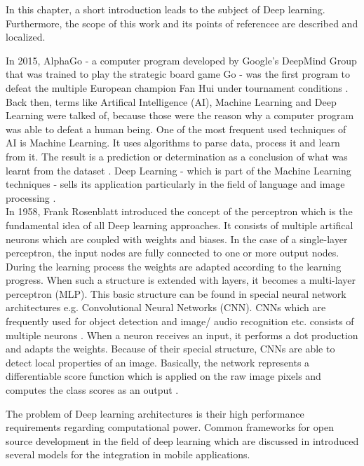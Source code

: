In this chapter, a short introduction leads to the subject of Deep learning. Furthermore, the scope of this work and its points of referencee are described and localized.

		
In 2015, AlphaGo - a computer program developed by Google's DeepMind Group that was trained to play the strategic board game Go - was the first program to defeat the multiple European champion Fan Hui under tournament conditions \citep{DeepMind}. Back then, terms like Artifical Intelligence (AI), Machine Learning and Deep Learning were talked of, because those were the reason why a computer program was able to defeat a human being. One of the most frequent used techniques of AI is Machine Learning. It uses algorithms to parse data, process it and learn from it. The result is a prediction or determination as a conclusion of what was learnt from the dataset \citep{NVIDIA-MichaelCopeland2016}. Deep Learning - which is part of the Machine Learning techniques - sells its application particularly in the field of language and image processing \citep{Wick2017}. \\

In 1958, Frank Rosenblatt introduced the concept of the perceptron which is the fundamental idea of all Deep learning approaches. It consists of multiple artifical neurons which are coupled with weights and biases. In the case of a single-layer perceptron, the input nodes are fully connected to one or more output nodes. During the learning process the weights are adapted according to the learning progress. When such a structure is extended with layers, it becomes a multi-layer perceptron (MLP). This basic structure can be found in special neural network architectures e.g. Convolutional Neural Networks (CNN). CNNs which are frequently used for object detection and image/ audio recognition etc. consists of multiple neurons \citep{Wick2017}. When a neuron receives an input, it performs a dot production and adapts the weights. Because of their special structure, CNNs are able to detect local properties of an image. Basically, the network represents a differentiable score function which is applied on the raw image pixels and computes the class scores as an output \citep{UniversityOfStanford}.
 
The problem of Deep learning architectures is their high performance requirements regarding computational power. Common frameworks for open source development in the field of deep learning which are discussed in  introduced several models for the integration in mobile applications. \\

